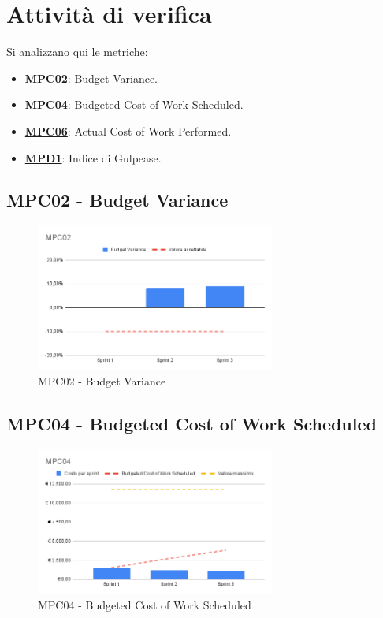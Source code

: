 \section{Attività di verifica}
Si analizzano qui le metriche:
\begin{itemize}
    \item \hyperref[s:mpc02]{\textbf{MPC02}}\textbf{}: Budget Variance.
    \item \hyperref[s:mpc04]{\textbf{MPC04}}\textbf{}: Budgeted Cost of Work Scheduled.
    \item \hyperref[s:mpc06]{\textbf{MPC06}}\textbf{}: Actual Cost of Work Performed.
    \item \hyperref[s:mpd1]{\textbf{MPD1}}\textbf{}: Indice di Gulpease.
\end{itemize}

\subsection{MPC02 - Budget Variance}
\label{s:mpc02}
\begin{figure}[htbp]
    \centering
    \includegraphics[width=0.7\textwidth]{img/MPC02.png}
    \caption{MPC02 - Budget Variance}
    \label{fig:mpc02}
\end{figure}


\newpage
\subsection{MPC04 - Budgeted Cost of Work Scheduled}
\label{s:mpc04}
\begin{figure}[htbp]
    \centering
    \includegraphics[width=0.7\textwidth]{img/MPC04.png}
    \caption{MPC04 - Budgeted Cost of Work Scheduled}
    \label{fig:mpc04}
\end{figure}

